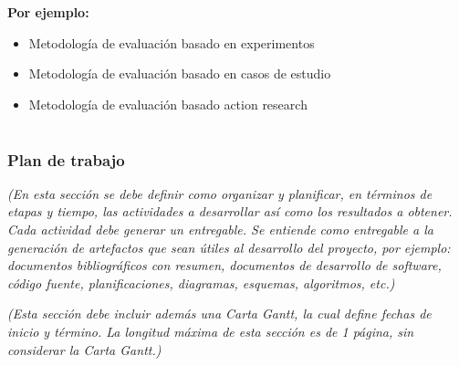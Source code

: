 \documentclass[11pt,letterpaper]{article}
\begin{document}
\textbf{Por ejemplo:}
\begin{itemize}
	\item Metodología de evaluación basado en experimentos
	\item Metodología de evaluación basado en casos de estudio
		\item Metodología de evaluación basado action research
\end{itemize}

\part{%
%
}

\section{Plan de trabajo}
\emph{(En esta sección se debe definir como organizar y planificar, en términos de etapas y tiempo, las actividades a desarrollar así como los resultados a obtener.  Cada actividad debe generar un entregable. Se entiende como entregable a la generación de artefactos que sean útiles al desarrollo del proyecto, por ejemplo: documentos bibliográficos con resumen, documentos de desarrollo de software, código fuente, planificaciones, diagramas, esquemas, algoritmos, etc.)}

\emph{(Esta sección debe incluir además una Carta Gantt, la cual define fechas de inicio y término. La longitud máxima de esta sección es de 1 página, sin considerar la Carta Gantt.)}
\end{document}
